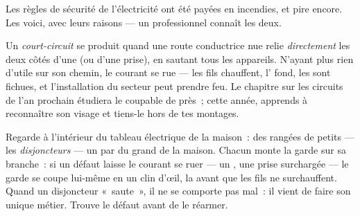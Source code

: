 Les règles de sécurité de l'électricité ont été payées en incendies,
et pire encore. Les voici, avec leurs raisons --- un professionnel
connaît les deux.

\begin{definition}\label{def:g6:circuits-and-safety:short}
Un \emph{court-circuit} se produit quand une
route conductrice nue relie \emph{directement} les deux côtés d'une
 (ou d'une prise), en sautant tous les appareils. N'ayant plus
rien d'utile sur son chemin, le courant se rue --- les fils
chauffent, l' fond, les  sont fichues, et l'installation
du secteur peut prendre feu. Le chapitre sur les circuits de l'an
prochain étudiera le coupable de près~; cette année, apprends à
reconnaître son visage et tiens-le hors de tes montages.
\end{definition}

\begin{remark}\label{rem:g6:circuits-and-safety:guards}
Regarde à l'intérieur du tableau électrique de la maison~: des
rangées de petits  --- les \emph{disjoncteurs} --- un
par  du grand  de la maison. Chacun monte
la garde sur sa branche~: si un défaut laisse le courant se ruer ---
un , une prise surchargée --- le garde se coupe
lui-même en un clin d'œil,  la  avant que les fils ne
surchauffent. Quand un disjoncteur «~saute~», il ne se comporte pas
mal~: il vient de faire son unique métier. Trouve le défaut avant de
le réarmer.
\end{remark}


